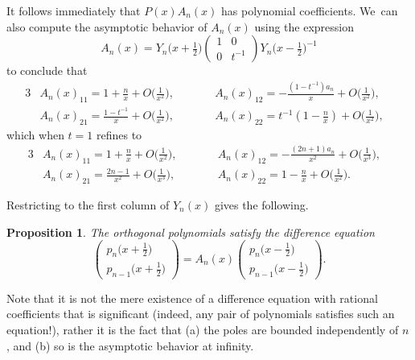 \documentclass[pdftex]{sigma}
\newtheorem{Proposition}[Theorem]{Proposition}
\theoremstyle{definition}
\numberwithin{equation}{section}
\begin{document}
It follows immediately that $P(x)A_n(x)$ has polynomial coefficients. We~can also compute the asymptotic behavior of $A_n(x)$ using the expression
\[
A_n(x)
=
Y_n\big(x+\tfrac{1}{2}\big)
\begin{pmatrix}
 1 & 0\\
 0 & t^{-1}
\end{pmatrix}
Y_n\big(x-\tfrac{1}{2}\big)^{-1}
\]
to conclude that
\begin{alignat*}{3}
& A_n(x)_{11} = 1+\tfrac{n}{x}+O\big(\tfrac{1}{x^2}\big),\qquad&&
A_n(x)_{12} = -\tfrac{(1-t^{-1})a_n}{x} + O\big(\tfrac{1}{x^2}\big),&\\
&A_n(x)_{21} = \tfrac{1-t^{-1}}{x}+O\big(\tfrac{1}{x^2}\big),\qquad&&
A_n(x)_{22} = t^{-1}(1-\tfrac{n}{x})+O\big(\tfrac{1}{x^2}\big),&
\end{alignat*}
which when $t=1$ refines to
\begin{alignat*}{3}
&A_n(x)_{11} = 1+\tfrac{n}{x}+O\big(\tfrac{1}{x^2}\big),\qquad&&
A_n(x)_{12} = -\tfrac{(2n+1)a_n}{x^2} + O\big(\tfrac{1}{x^3}\big),&\\
&A_n(x)_{21} = \tfrac{2n-1}{x^2}+O\big(\tfrac{1}{x^3}\big),\qquad&&
A_n(x)_{22} = 1-\tfrac{n}{x}+O\big(\tfrac{1}{x^2}\big).&
\end{alignat*}

Restricting to the first column of $Y_n(x)$ gives the following.

\begin{Proposition}
 The orthogonal polynomials satisfy the difference equation
 \[
 \begin{pmatrix}
 p_n\big(x+\frac{1}{2}\big)\\[1ex]
 p_{n-1}\big(x+\frac{1}{2}\big)
 \end{pmatrix}
 = A_n(x)
 \begin{pmatrix}
 p_n\big(x-\tfrac{1}{2}\big)\\[1ex]
 p_{n-1}\big(x-\tfrac{1}{2}\big)
 \end{pmatrix} .
 \]
\end{Proposition}

Note that it is not the mere existence of a difference equation with
rational coefficients that is significant (indeed, any pair of polynomials
satisfies such an equation!), rather it is the fact that (a) the poles are
bounded independently of $n$, and (b) so is the asymptotic behavior at
infinity.
\end{document}
